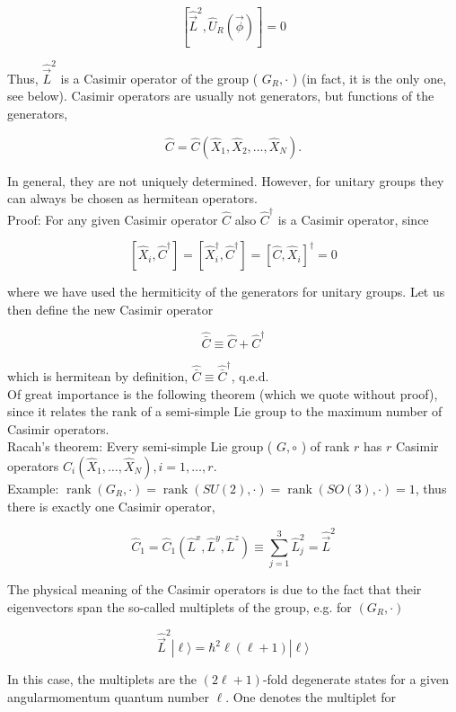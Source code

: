 \documentclass[10pt, letterpaper]{article}
\begin{document}
$$
\left[\hat{\vec{L}}^{2}, \hat{U}_{R}(\vec{\phi})\right]=0
$$

Thus, $\hat{\vec{L}}^{2}$ is a Casimir operator of the group ( $G_{R}, \cdot$ ) (in fact, it is the only one, see below). Casimir operators are usually not generators, but functions of the generators,

$$
\hat{C}=\hat{C}\left(\hat{X}_{1}, \hat{X}_{2}, \ldots, \hat{X}_{N}\right) .
$$

In general, they are not uniquely determined. However, for unitary groups they can always be chosen as hermitean operators.\\
Proof: For any given Casimir operator $\hat{C}$ also $\hat{C}^{\dagger}$ is a Casimir operator, since

$$
\left[\hat{X}_{i}, \hat{C}^{\dagger}\right]=\left[\hat{X}_{i}^{\dagger}, \hat{C}^{\dagger}\right]=\left[\hat{C}, \hat{X}_{i}\right]^{\dagger}=0
$$

where we have used the hermiticity of the generators for unitary groups. Let us then define the new Casimir operator

$$
\hat{\bar{C}} \equiv \hat{C}+\hat{C}^{\dagger}
$$

which is hermitean by definition, $\hat{\bar{C}} \equiv \hat{\bar{C}}^{\dagger}$, q.e.d.\\
Of great importance is the following theorem (which we quote without proof), since it relates the rank of a semi-simple Lie group to the maximum number of Casimir operators.\\
Racah's theorem: Every semi-simple Lie group ( $G, \circ$ ) of rank $r$ has $r$ Casimir operators $\hat{C}_{i}\left(\hat{X}_{1}, \ldots, \hat{X}_{N}\right), i=1, \ldots, r$.\\
Example: $\operatorname{rank}\left(G_{R}, \cdot\right)=\operatorname{rank}(S U(2), \cdot)=\operatorname{rank}(S O(3), \cdot)=1$, thus there is exactly one Casimir operator,

$$
\hat{C}_{1}=\hat{C}_{1}\left(\hat{L}^{x}, \hat{L}^{y}, \hat{L}^{z}\right) \equiv \sum_{j=1}^{3} \hat{L}_{j}^{2}=\hat{\vec{L}}^{2}
$$

The physical meaning of the Casimir operators is due to the fact that their eigenvectors span the so-called multiplets of the group, e.g. for $\left(G_{R}, \cdot\right)$

$$
\hat{\vec{L}}^{2}|\ell\rangle=\hbar^{2} \ell(\ell+1)|\ell\rangle
$$

In this case, the multiplets are the $(2 \ell+1)$-fold degenerate states for a given angularmomentum quantum number $\ell$. One denotes the multiplet for
\end{document}
